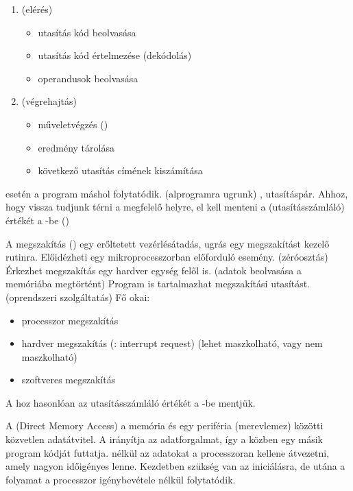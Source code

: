 \documentclass[main.tex]{subfiles}
\begin{document}
  \begin{enumerate}
    \item {} (elérés)
    \begin{itemize}
      \item utasítás kód beolvasása
      \item utasítás kód értelmezése (dekódolás)
      \item operandusok beolvasása
    \end{itemize}
    \item {} (végrehajtás)
    \begin{itemize}
      \item műveletvégzés ()
      \item eredmény tárolása
      \item következő utasítás címének kiszámítása
    \end{itemize}
  \end{enumerate}
  
   esetén a program máshol folytatódik.
  (alprogramra ugrunk)
  ,  utasításpár.
  Ahhoz, hogy vissza tudjunk térni a megfelelő helyre,
  el kell menteni a  (utasításszámláló)
  értékét a -be ()

  A megszakítás () egy erőltetett vezérlésátadás,
  ugrás egy megszakítást kezelő rutinra. Előidézheti
  egy mikroprocesszorban előforduló esemény. (zéróosztás)
  Érkezhet megszakítás egy hardver egység felől is.
  (adatok beolvasása a memóriába megtörtént)
  Program is tartalmazhat megszakítási utasítást.
  (oprendszeri szolgáltatás) Fő okai:
  \begin{itemize}
    \item processzor megszakítás
    \item hardver megszakítás (: interrupt request)
    (lehet maszkolható, vagy nem maszkolható)
    \item szoftveres megszakítás
  \end{itemize}
  A hoz hasonlóan
  az utasításszámláló értékét a -be mentjük.

  A  (Direct Memory Access) a memória
  és egy periféria (merevlemez) közötti közvetlen
  adatátvitel. A  irányítja az
  adatforgalmat, így a  közben egy
  másik program kódját futtatja.  nélkül
  az adatokat a processzoran kellene átvezetni,
  amely nagyon időigényes lenne. Kezdetben szükség
  van az iniciálásra, de utána a folyamat a processzor
  igénybevétele nélkül folytatódik.
\end{document}
